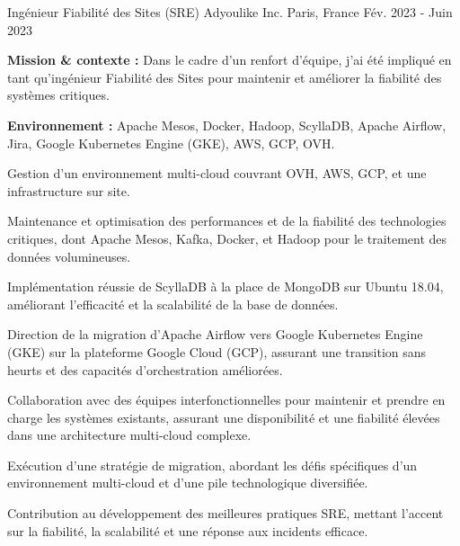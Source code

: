 \begin{cventries}
\cventry
{Ingénieur Fiabilité des Sites (SRE)} %
{Adyoulike Inc.} %
{Paris, France} %
{Fév. 2023 - Juin 2023} %
{
  \begin{cvitems} %
    \item {\textbf{Mission \& contexte :} Dans le cadre d'un renfort d'équipe, j'ai été impliqué en tant qu'ingénieur Fiabilité des Sites pour maintenir et améliorer la fiabilité des systèmes critiques.}
    \item {\textbf{Environnement :} Apache Mesos, Docker, Hadoop, ScyllaDB, Apache Airflow, Jira, Google Kubernetes Engine (GKE), AWS, GCP, OVH.}
    \item {Gestion d'un environnement multi-cloud couvrant OVH, AWS, GCP, et une infrastructure sur site.}
    \item {Maintenance et optimisation des performances et de la fiabilité des technologies critiques, dont Apache Mesos, Kafka, Docker, et Hadoop pour le traitement des données volumineuses.}
    \item {Implémentation réussie de ScyllaDB à la place de MongoDB sur Ubuntu 18.04, améliorant l'efficacité et la scalabilité de la base de données.}
    \item {Direction de la migration d'Apache Airflow vers Google Kubernetes Engine (GKE) sur la plateforme Google Cloud (GCP), assurant une transition sans heurts et des capacités d'orchestration améliorées.}
    \item {Collaboration avec des équipes interfonctionnelles pour maintenir et prendre en charge les systèmes existants, assurant une disponibilité et une fiabilité élevées dans une architecture multi-cloud complexe.}
    \item {Exécution d'une stratégie de migration, abordant les défis spécifiques d'un environnement multi-cloud et d'une pile technologique diversifiée.}
    \item {Contribution au développement des meilleures pratiques SRE, mettant l'accent sur la fiabilité, la scalabilité et une réponse aux incidents efficace.}
  \end{cvitems}
}


\end{cventries}
